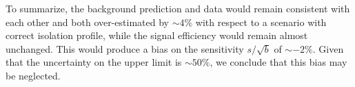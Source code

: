 To summarize, the background prediction and data would remain consistent with each other and both over-estimated by $\sim 4\%$ with respect to a scenario with correct isolation profile, while the signal efficiency would remain almost unchanged.
This would produce a bias on the sensitivity $s/\sqrt{b}$ of $\sim -2\%$. Given that the uncertainty on the upper limit is $\sim 50\%$, we conclude that this bias may be neglected.




  
